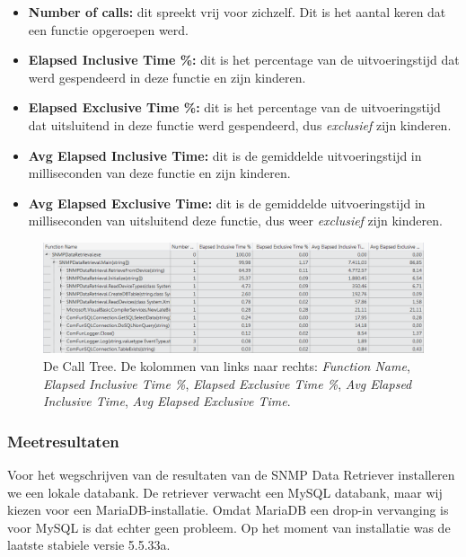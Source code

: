 \begin{itemize}
	\item \textbf{Number of calls:}
		dit spreekt vrij voor zichzelf. Dit is het aantal keren dat een functie opgeroepen werd.
	\item \textbf{Elapsed Inclusive Time \%:}
		dit is het percentage van de uitvoeringstijd dat werd gespendeerd in deze functie en zijn kinderen.
	\item \textbf{Elapsed Exclusive Time \%:}
		dit is het percentage van de uitvoeringstijd dat uitsluitend in deze functie werd gespendeerd, dus \emph{exclusief} zijn kinderen.
	\item \textbf{Avg Elapsed Inclusive Time:}
		dit is de gemiddelde uitvoeringstijd in milliseconden van deze functie en zijn kinderen.
	\item \textbf{Avg Elapsed Exclusive Time:}
		dit is de gemiddelde uitvoeringstijd in milliseconden van uitsluitend deze functie, dus weer \emph{exclusief} zijn kinderen.
\end{itemize}

\begin{figure}[h]
	\centering
	\includegraphics[scale=0.50]{figures/profiler/call-tree}
	\caption[De Call Tree]{De Call Tree. De kolommen van links naar rechts:
		\emph{Function Name},
		\emph{Elapsed Inclusive Time \%},
		\emph{Elapsed Exclusive Time \%},
		\emph{Avg Elapsed Inclusive Time},
		\emph{Avg Elapsed Exclusive Time}.}
	\label{call-tree}
\end{figure}

\subsubsection{Meetresultaten}

Voor het wegschrijven van de resultaten van de SNMP Data Retriever installeren we een lokale databank.
De retriever verwacht een MySQL databank, maar wij kiezen voor een MariaDB-installatie.
Omdat MariaDB een drop-in vervanging is voor MySQL is dat echter geen probleem.
Op het moment van installatie was de laatste stabiele versie 5.5.33a.

